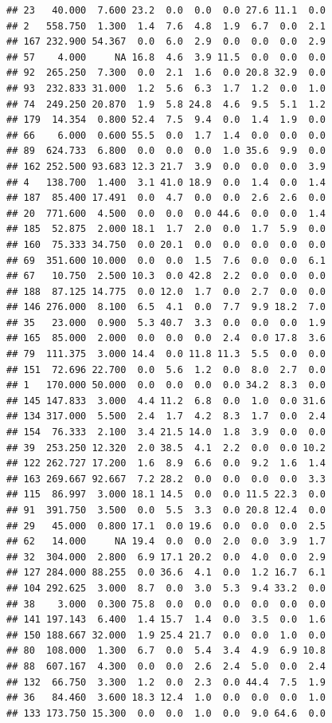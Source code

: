\documentclass[]{report}
\begin{document}
\begin{verbatim}
## 23   40.000  7.600 23.2  0.0  0.0  0.0 27.6 11.1  0.0
## 2   558.750  1.300  1.4  7.6  4.8  1.9  6.7  0.0  2.1
## 167 232.900 54.367  0.0  6.0  2.9  0.0  0.0  0.0  2.9
## 57    4.000     NA 16.8  4.6  3.9 11.5  0.0  0.0  0.0
## 92  265.250  7.300  0.0  2.1  1.6  0.0 20.8 32.9  0.0
## 93  232.833 31.000  1.2  5.6  6.3  1.7  1.2  0.0  1.0
## 74  249.250 20.870  1.9  5.8 24.8  4.6  9.5  5.1  1.2
## 179  14.354  0.800 52.4  7.5  9.4  0.0  1.4  1.9  0.0
## 66    6.000  0.600 55.5  0.0  1.7  1.4  0.0  0.0  0.0
## 89  624.733  6.800  0.0  0.0  0.0  1.0 35.6  9.9  0.0
## 162 252.500 93.683 12.3 21.7  3.9  0.0  0.0  0.0  3.9
## 4   138.700  1.400  3.1 41.0 18.9  0.0  1.4  0.0  1.4
## 187  85.400 17.491  0.0  4.7  0.0  0.0  2.6  2.6  0.0
## 20  771.600  4.500  0.0  0.0  0.0 44.6  0.0  0.0  1.4
## 185  52.875  2.000 18.1  1.7  2.0  0.0  1.7  5.9  0.0
## 160  75.333 34.750  0.0 20.1  0.0  0.0  0.0  0.0  0.0
## 69  351.600 10.000  0.0  0.0  1.5  7.6  0.0  0.0  6.1
## 67   10.750  2.500 10.3  0.0 42.8  2.2  0.0  0.0  0.0
## 188  87.125 14.775  0.0 12.0  1.7  0.0  2.7  0.0  0.0
## 146 276.000  8.100  6.5  4.1  0.0  7.7  9.9 18.2  7.0
## 35   23.000  0.900  5.3 40.7  3.3  0.0  0.0  0.0  1.9
## 165  85.000  2.000  0.0  0.0  0.0  2.4  0.0 17.8  3.6
## 79  111.375  3.000 14.4  0.0 11.8 11.3  5.5  0.0  0.0
## 151  72.696 22.700  0.0  5.6  1.2  0.0  8.0  2.7  0.0
## 1   170.000 50.000  0.0  0.0  0.0  0.0 34.2  8.3  0.0
## 145 147.833  3.000  4.4 11.2  6.8  0.0  1.0  0.0 31.6
## 134 317.000  5.500  2.4  1.7  4.2  8.3  1.7  0.0  2.4
## 154  76.333  2.100  3.4 21.5 14.0  1.8  3.9  0.0  0.0
## 39  253.250 12.320  2.0 38.5  4.1  2.2  0.0  0.0 10.2
## 122 262.727 17.200  1.6  8.9  6.6  0.0  9.2  1.6  1.4
## 163 269.667 92.667  7.2 28.2  0.0  0.0  0.0  0.0  3.3
## 115  86.997  3.000 18.1 14.5  0.0  0.0 11.5 22.3  0.0
## 91  391.750  3.500  0.0  5.5  3.3  0.0 20.8 12.4  0.0
## 29   45.000  0.800 17.1  0.0 19.6  0.0  0.0  0.0  2.5
## 62   14.000     NA 19.4  0.0  0.0  2.0  0.0  3.9  1.7
## 32  304.000  2.800  6.9 17.1 20.2  0.0  4.0  0.0  2.9
## 127 284.000 88.255  0.0 36.6  4.1  0.0  1.2 16.7  6.1
## 104 292.625  3.000  8.7  0.0  3.0  5.3  9.4 33.2  0.0
## 38    3.000  0.300 75.8  0.0  0.0  0.0  0.0  0.0  0.0
## 141 197.143  6.400  1.4 15.7  1.4  0.0  3.5  0.0  1.6
## 150 188.667 32.000  1.9 25.4 21.7  0.0  0.0  1.0  0.0
## 80  108.000  1.300  6.7  0.0  5.4  3.4  4.9  6.9 10.8
## 88  607.167  4.300  0.0  0.0  2.6  2.4  5.0  0.0  2.4
## 132  66.750  3.300  1.2  0.0  2.3  0.0 44.4  7.5  1.9
## 36   84.460  3.600 18.3 12.4  1.0  0.0  0.0  0.0  1.0
## 133 173.750 15.300  0.0  0.0  1.0  0.0  9.0 64.6  0.0

\end{verbatim}
\end{document}
